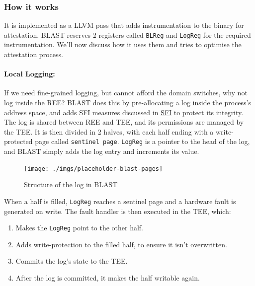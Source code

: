 \documentclass[a4paper, nobind]{templates/ociamthesis}
\providecommand{\tightlist}{%
  \setlength{\itemsep}{0pt}\setlength{\parskip}{0pt}}
\begin{document}
\subsubsection{How it works}\label{how-it-works}

It is implemented as a LLVM pass that adds instrumentation to the binary for attestation.
BLAST reserves 2 registers called \texttt{BLReg} and \texttt{LogReg} for the required instrumentation.
We'll now discuss how it uses them and tries to optimise the attestation process.

\paragraph{Local Logging:}\label{local-logging}

If we need fine-grained logging, but cannot afford the domain switches, why not log inside the REE?
BLAST does this by pre-allocating a log inside the process's address space,
and adds SFI measures discussed in \hyperref[blastsfi]{SFI} to protect its integrity.
The log is shared between REE and TEE, and its permissions are managed by the TEE.
It is then divided in 2 halves, with each half ending with a write-protected page called \texttt{sentinel\ page}.
\texttt{LogReg} is a pointer to the head of the log, and BLAST simply adds the log entry
and increments its value.

\begin{figure}[H]

{\centering \texttt{[image: ./imgs/placeholder-blast-pages]} 

}

\caption{Structure of the log in BLAST}\label{fig:blast-log-pages}
\end{figure}

When a half is filled, \texttt{LogReg} reaches a sentinel page and a hardware fault is generated on write.
The fault handler is then executed in the TEE, which:

\begin{enumerate}
\def\labelenumi{\arabic{enumi}.}
\tightlist
\item
  Makes the \texttt{LogReg} point to the other half.
\item
  Adds write-protection to the filled half, to ensure it isn't overwritten.
\item
  Commits the log's state to the TEE.
\item
  After the log is committed, it makes the half writable again.
\end{enumerate}
\end{document}

